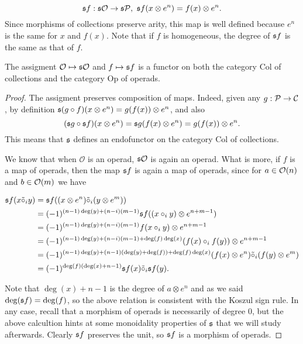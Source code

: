 \documentclass[Thesis.tex]{subfiles}
\begin{document}
\begin{equation}\label{sf}
\mathfrak{s} f:\mathfrak{s}{\mathcal O}\to\mathfrak{s}\mathcal{P},\ \mathfrak{s} f(x\otimes e^n)=f(x)\otimes e^n.
\end{equation}
Since morphisms of collections preserve arity, this map is well defined because $e^n$ is the same for $x$ and $f(x)$. Note that if $f$ is homogeneous, the degree of $\mathfrak{s} f$ is the same as that of $f$.

\begin{lem}
The assigment ${\mathcal O}\mapsto \mathfrak{s}{\mathcal O}$ and $f\mapsto \mathfrak{s} f$ is a functor on both the category $\mathrm{Col}$ of collections and the category $\mathrm{Op}$ of operads.
\end{lem}

\begin{proof}
The assigment preserves composition of maps. Indeed, given any $g:\mathcal{P}\to{\mathcal C}$, by definition $\mathfrak{s}(g\circ f)(x\otimes e^n)=g(f(x))\otimes e^n$, and also \[(\mathfrak{s} g\circ \mathfrak{s} f)(x\otimes e^n)=\mathfrak{s} g (f(x)\otimes e^n)=g(f(x))\otimes e^n.\] This means that $\mathfrak{s}$ defines an endofunctor on the category $\mathrm{Col}$ of collections.


We know that when $\mathcal{O}$ is an operad, $\mathfrak{s}{\mathcal O}$ is again  an operad. What is more, if $f$ is a map of operads, then the map $\mathfrak{s} f$ is again a map of operads, since for $a\in{\mathcal O}(n)$ and $b\in{\mathcal O}(m)$ we have

\begin{align*}
\mathfrak{s} f(x\tilde{\circ}_i y)&=\mathfrak{s} f ((x\otimes e^n)\tilde{\circ}_i (y\otimes e^m))\\
&=(-1)^{(n-1)\deg(y)+(n-i)(m-1)}\mathfrak{s} f((x\circ_i y) \otimes e^{n+m-1})\\
&=(-1)^{(n-1)\deg(y)+(n-i)(m-1)}f(x\circ_i y)\otimes e^{n+m-1}\\
&=(-1)^{(n-1)\deg(y)+(n-i)(m-1)+\deg(f)\deg(x)}(f(x)\circ_i f(y))\otimes e^{n+m-1}\\
&=(-1)^{(n-1)\deg(y)+(n-1)(\deg(y)+\deg(f))+\deg(f)\deg(x)}(f(x)\otimes e^n)\tilde{\circ}_i (f(y)\otimes e^m)\\
&=(-1)^{\deg(f)(\deg(x)+n-1)}\mathfrak{s} f(x)\tilde{\circ}_i\mathfrak{s} f(y).
\end{align*}

Note that $\deg(x)+n-1$ is the degree of $a\otimes e^n$ and as we said $\deg(\mathfrak{s} f)=\deg(f)$, so the above relation is consistent with the Koszul sign rule. In any case, recall that a morphism of operads is necessarily of degree 0, but the above calcultion hints at some monoidality properties of $\mathfrak{s}$ that we will study afterwards. Clearly $\mathfrak{s} f$ preserves the unit, so $\mathfrak{s} f$ is a morphism of operads. 
\end{proof}
\end{document}
